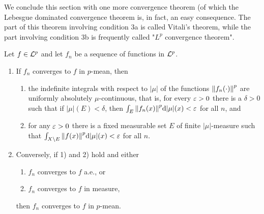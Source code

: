 We conclude this section with one more convergence theorem (of which the Lebesgue dominated convergence theorem is, in fact, an easy consequence. The part of this theorem involving condition 3a is called Vitali's theorem, while the part involving condition 3b is frequently called "$L^p$ convergence theorem".

\begin{theorem}
Let $f\in{\cal L}^p$ and let $f_n$ be a sequence of functions in ${\cal L}^p$.
\begin{enumerate}[label=\Roman*)]
    \item If $f_n$ converges to $f$ in $p$-mean, then
    \begin{enumerate}[label=\arabic*)]
        \item the indefinite integrals with respect to $|\mu|$ of the functions $\norm{f_n(\cdot)}^p$ are uniformly absolutely $\mu$-continuous, that is, for every $\varepsilon>0$ there is a $\delta>0$ such that if $|\mu|(E)<\delta$, then $\int_E\norm{f_n(x)}^p\dd|\mu|(x)<\varepsilon$ for all $n$, and
        
        \item for any $\varepsilon>0$ there is a fixed measurable set $E$ of finite $|\mu|$-measure such that $\int_{X\setminus E}\norm{f(x)}^p\dd|\mu|(x)<\varepsilon$ for all $n$.
    \end{enumerate}
    
    \item Conversely, if 1) and 2) hold and either
    \begin{enumerate}[label=3\alph*)]
        \item $f_n$ converges to $f$ a.e., or
        \item $f_n$ converges to $f$ in measure, 
    \end{enumerate}
    then $f_n$ converges to $f$ in $p$-mean.
\end{enumerate}
\end{theorem}

